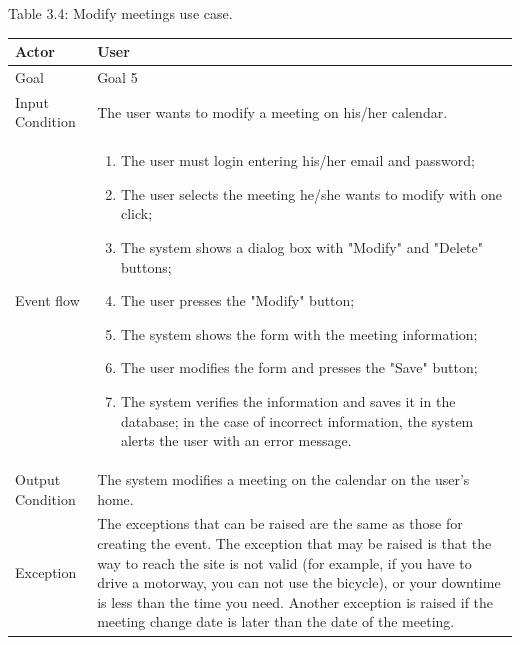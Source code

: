 \documentclass{article}
\begin{document}
	\begin{center}
		Table 3.4: Modify meetings use case.
		
		\bigskip
    		\begin{tabular}{p{}|p{}}
   			\hline
    			Actor & User \\ \hline
    			Goal &  Goal 5 \\ \hline
    			Input Condition & The user wants to modify a meeting on his/her calendar. \\ \hline
			Event flow & 
			\begin{enumerate}
  				\item The user must login entering his/her email and password;
  				\item The user selects the meeting he/she wants to modify with one click;
  				\item The system shows a dialog box with "Modify" and "Delete" buttons;
  				\item The user presses the "Modify" button;
  				\item The system shows the form with the meeting information;
  				\item The user modifies the form and presses the "Save" button;
  				\item The system verifies the information and saves it in the database; in the case of incorrect information, the system alerts the user with an error message.
 			 \end{enumerate} \\ \hline
    			Output Condition & The system modifies a meeting on the calendar on the user's home. \\ \hline
    			Exception & The exceptions that can be raised are the same as those for creating the event. The exception that may be raised is that the way to reach the site is not valid (for example, if you have to drive a motorway, you can not use the bicycle), or your downtime is less than the time you need. Another exception is raised if the meeting change date is later than the date of the meeting. \\ \hline
    		\end{tabular}
	\end{center}
	
\end{document}
